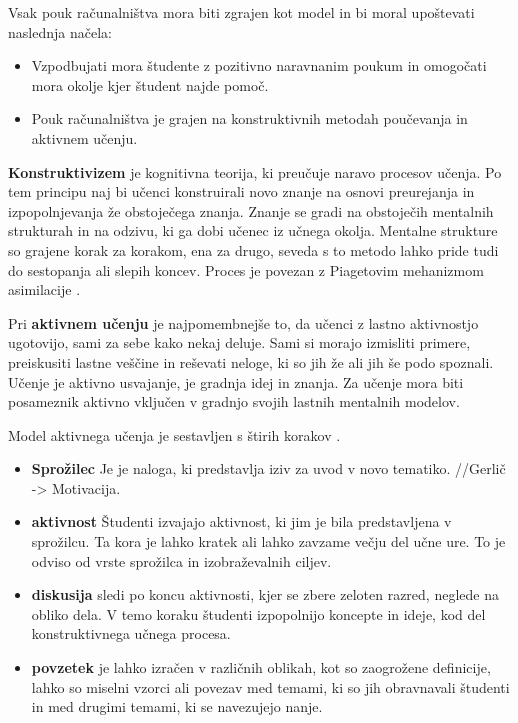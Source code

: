 Vsak pouk računalništva mora biti zgrajen kot model in bi moral
upoštevati naslednja načela:
\begin{itemize}
\item Vzpodbujati mora študente z pozitivno naravnanim poukum in
   omogočati mora okolje kjer študent najde pomoč.
 \item Pouk računalništva je grajen na konstruktivnih metodah poučevanja
   in aktivnem učenju.
\end{itemize}

\textbf{Konstruktivizem} je kognitivna teorija, ki preučuje naravo
procesov učenja. Po tem principu naj bi učenci konstruirali novo
znanje na osnovi preurejanja in izpopolnjevanja že obstoječega
znanja. Znanje se gradi na obstoječih mentalnih strukturah in na
odzivu, ki ga dobi učenec iz učnega okolja. Mentalne strukture so
grajene korak za korakom, ena za drugo, seveda s to metodo lahko pride
tudi do sestopanja ali slepih koncev. Proces je povezan z Piagetovim
mehanizmom asimilacije \cite{guideTCS}.

Pri \textbf{aktivnem učenju} je najpomembnejše to, da učenci z lastno
aktivnostjo ugotovijo, sami za sebe kako nekaj deluje. Sami si morajo
izmisliti primere, preiskusiti lastne veščine in reševati neloge, ki
so jih že ali jih še podo spoznali. Učenje je aktivno usvajanje, je
gradnja idej in znanja. Za učenje mora biti posameznik aktivno
vključen v gradnjo svojih lastnih mentalnih modelov.

Model aktivnega učenja je sestavljen s štirih korakov \cite{guideTCS}.

\begin{itemize}
\item \textbf{Sprožilec} Je je naloga, ki predstavlja  iziv za uvod v novo
tematiko.  //Gerlič -> Motivacija.
\item \textbf{aktivnost} Študenti izvajajo aktivnost, ki jim je bila
predstavljena v sprožilcu. Ta kora je lahko kratek ali lahko
zavzame večju del učne ure. To je odviso od vrste sprožilca in
izobraževalnih ciljev.
\item \textbf{diskusija} sledi po koncu aktivnosti, kjer se zbere zeloten
razred, neglede na obliko dela. V temo koraku študenti izpopolnijo
koncepte in ideje, kod del konstruktivnega učnega procesa.
\item \textbf{povzetek} je lahko izračen v različnih oblikah, kot so
zaogrožene definicije, lahko so miselni vzorci ali povezav med
temami, ki so jih obravnavali študenti in med drugimi temami, ki se
navezujejo nanje.
\end{itemize}

